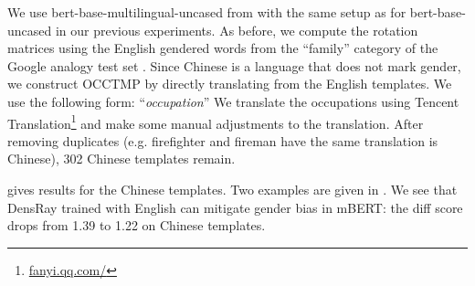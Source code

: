 We use  bert-base-multilingual-uncased from
\cite{wolf2019huggingfaces} with the same setup as for
bert-base-uncased in our previous experiments. As before, we
compute the rotation matrices using the English gendered
words from the ``family'' category of the Google analogy
test set \cite{mikolov2013efficient}. Since Chinese is a language that does not mark gender, we construct OCCTMP by directly translating from the English templates. We use the following form:
``\text{[MASK]}\textit{occupation}'' We translate the occupations using Tencent Translation\footnote{\url{fanyi.qq.com/}} and make some manual adjustments to the translation. After removing duplicates (e.g. firefighter and fireman have the same translation is Chinese), 302 Chinese templates remain.

 gives results for the Chinese templates. Two examples are given in . We see that DensRay trained with English can mitigate gender bias in mBERT: the diff score drops from 1.39 to 1.22 on Chinese templates. 
